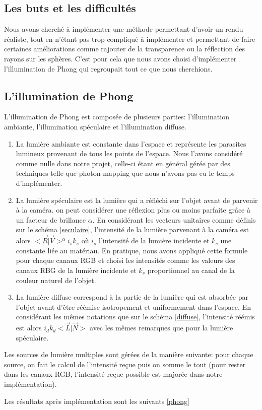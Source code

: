 \subsection{Les buts et les difficultés}
Nous avons cherché à implémenter une méthode permettant d'avoir un rendu réaliste, tout en n'étant pas trop compliqué à implémenter et permettant de faire certaines améliorations comme rajouter de la transparence ou la réflection des rayons sur les sphères. C'est pour cela que nous avons choisi d'implémenter l'illumination de Phong qui regroupait tout ce que nous cherchions.

\subsection{L'illumination de Phong}

L'illumination de Phong est composée de plusieurs parties: l'illumination ambiante, l'illumination spéculaire et l'illumination diffuse.
\begin{enumerate}
\item La lumière ambiante est constante dans l'espace et représente les parasites lumineux provenant de tous les points de l'espace. Nous l'avons considéré comme nulle dans notre projet, celle-ci étant en général gérée par des techniques telle que photon-mapping que nous n'avons pas eu le temps d'implémenter.
\item La lumière spéculaire est la lumière qui a réfléchi sur l'objet avant de parvenir à la caméra. on peut considérer une réflexion plus ou moins parfaite grâce à un facteur de brillance $\alpha$. En considérant les vecteurs unitaires comme définis sur le schéma \ref{seculaire}, l'intensité de la lumière parvenant à la caméra est alors $<\vec{R}|\vec{V}>^{\alpha} i_{s} k_{s}$ où $i_{s}$ l'intensité de la lumière incidente et $k_{s}$ une constante liée au matériau. En pratique, nous avons appliqué cette formule pour chaque canaux RGB et choisi les intensités comme les valeurs des canaux RBG de la lumière incidente et $k_{s}$ proportionnel au canal de la couleur naturel de l'objet.
\item La lumière diffuse correspond à la partie de la lumière qui est absorbée par l'objet avant d'être réémise isotropement et uniformement dans l'espace. En considérant les mêmes notations que sur le schéma \ref{diffuse}, l'intensité réémis est alors $i_{d}k_{d}<\vec{L}|\vec{N}>$ avec les mêmes remarques que pour la lumière spéculaire.
\end{enumerate}

Les sources de lumière multiples sont gérées de la manière suivante: pour chaque source, on fait le calcul de l'intensité reçue puis on somme le tout (pour rester dans les canaux RGB, l'intensité reçue possible est majorée dans notre implémentation).

Les résultats après implémentation sont les suivants \ref{phong}